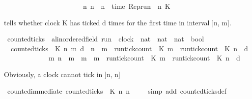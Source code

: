 \begin{isabellebody}
\ \ \ \ \ \ \ \ \ \ \ \ \ \ \ \ \ \ \ \ \ \ {\isasymand}\ {\isacharparenleft}{\isasymnexists}n{\isacharprime}{\isachardot}\ n{\isacharprime}\ {\isacharless}\ n\ {\isasymand}\ time\ {\isacharparenleft}{\isacharparenleft}Rep{\isacharunderscore}run\ {\isasymrho}{\isacharparenright}\ n{\isacharprime}\ K{\isacharparenright}\ {\isacharequal}\ {\isasymtau}{\isacharparenright}{\isacartoucheclose}%
\begin{isamarkuptext}%
 tells whether clock K has ticked d times for the
  first time in interval ]n, m].%
\end{isamarkuptext}\isamarkuptrue%
\isamarkupfalse%
\ counted{\isacharunderscore}ticks\ {\isacharcolon}{\isacharcolon}\ {\isacartoucheopen}{\isacharprime}a{\isacharcolon}{\isacharcolon}linordered{\isacharunderscore}field\ run\ {\isasymRightarrow}\ clock\ {\isasymRightarrow}\ nat\ {\isasymRightarrow}\ nat\ {\isasymRightarrow}\ nat\ {\isasymRightarrow}\ bool{\isacartoucheclose}\isanewline
{}\isanewline
\ \ {\isacartoucheopen}counted{\isacharunderscore}ticks\ {\isasymrho}\ K\ n\ m\ d\ {\isasymequiv}\ {\isacharparenleft}n\ {\isasymle}\ m{\isacharparenright}\ {\isasymand}\ {\isacharparenleft}run{\isacharunderscore}tick{\isacharunderscore}count\ {\isasymrho}\ K\ m\ {\isacharequal}\ run{\isacharunderscore}tick{\isacharunderscore}count\ {\isasymrho}\ K\ n\ {\isacharplus}\ d{\isacharparenright}\isanewline
\ \ \ \ \ \ \ \ \ \ \ \ {\isasymand}\ {\isacharparenleft}{\isasymnexists}m{\isacharprime}{\isachardot}\ {\isacharparenleft}n\ {\isasymle}\ m{\isacharprime}{\isacharparenright}\ {\isasymand}\ {\isacharparenleft}m{\isacharprime}\ {\isacharless}\ m{\isacharparenright}\ {\isasymand}\ run{\isacharunderscore}tick{\isacharunderscore}count\ {\isasymrho}\ K\ m{\isacharprime}\ {\isacharequal}\ run{\isacharunderscore}tick{\isacharunderscore}count\ {\isasymrho}\ K\ n\ {\isacharplus}\ d{\isacharparenright}\isanewline
\ \ {\isacartoucheclose}%
\begin{isamarkuptext}%
Obviously, a clock cannot tick in ]n, n]%
\end{isamarkuptext}\isamarkuptrue%
\isamarkupfalse%
\ counted{\isacharunderscore}immediate{\isacharcolon}\ {\isacartoucheopen}counted{\isacharunderscore}ticks\ {\isasymrho}\ K\ n\ n\ {}{\isacartoucheclose}\isanewline
%
\isadelimproof
\ \ %
\endisadelimproof
%
\isatagproof
{}\isamarkupfalse%
\ {\isacharparenleft}simp\ add{\isacharcolon}\ counted{\isacharunderscore}ticks{\isacharunderscore}def{\isacharparenright}%

\end{isabellebody}
